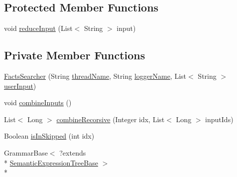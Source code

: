 \subsection*{Protected Member Functions}
\begin{DoxyCompactItemize}
\item 
void \hyperlink{classit_1_1emarolab_1_1cagg_1_1core_1_1evaluation_1_1inputFormatting_1_1ThreadedInputFormatter_1_1FactsSearcher_ac332861fb6efc1b301caf11e3c085838}{reduce\-Input} (List$<$ String $>$ input)
\end{DoxyCompactItemize}
\subsection*{Private Member Functions}
\begin{DoxyCompactItemize}
\item 
\hyperlink{classit_1_1emarolab_1_1cagg_1_1core_1_1evaluation_1_1inputFormatting_1_1ThreadedInputFormatter_1_1FactsSearcher_a8b1f17ad0a010b1a9c12cad5d1e384bc}{Facts\-Searcher} (String \hyperlink{classit_1_1emarolab_1_1cagg_1_1core_1_1evaluation_1_1CaggThread_a9f93a5dd960d289f5e2a1889f8b6f55b}{thread\-Name}, String \hyperlink{classit_1_1emarolab_1_1cagg_1_1core_1_1evaluation_1_1CaggThread_ae7dd4d1aec246c90d4a997b825978256}{logger\-Name}, List$<$ String $>$ \hyperlink{classit_1_1emarolab_1_1cagg_1_1core_1_1evaluation_1_1inputFormatting_1_1ThreadedInputFormatter_1_1FactsSearcher_a4cdee8a1a302117f14597c0457b2af6c}{user\-Input})
\item 
void \hyperlink{classit_1_1emarolab_1_1cagg_1_1core_1_1evaluation_1_1inputFormatting_1_1ThreadedInputFormatter_1_1FactsSearcher_a35d336157eee26c5523fbc4b55a63b20}{combine\-Inputs} ()
\item 
List$<$ Long $>$ \hyperlink{classit_1_1emarolab_1_1cagg_1_1core_1_1evaluation_1_1inputFormatting_1_1ThreadedInputFormatter_1_1FactsSearcher_a19db265e2aba88e7a6c1e3ebce4ceb82}{combine\-Recorsive} (Integer idx, List$<$ Long $>$ input\-Ids)
\item 
Boolean \hyperlink{classit_1_1emarolab_1_1cagg_1_1core_1_1evaluation_1_1inputFormatting_1_1ThreadedInputFormatter_1_1FactsSearcher_a642866309bd1c70e9c892c1845c5e63b}{is\-In\-Skipped} (int idx)
\item 
Grammar\-Base$<$ ?extends \\*
\hyperlink{interfaceit_1_1emarolab_1_1cagg_1_1core_1_1evaluation_1_1semanticGrammar_1_1syntaxCompiler_1_1SemanticExpressionTreeBase}{Semantic\-Expression\-Tree\-Base} $>$\\*

\end{DoxyCompactItemize}
